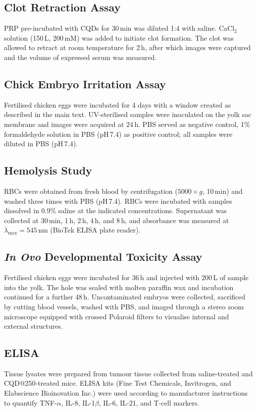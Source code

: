 \subsection*{Clot Retraction Assay}
PRP pre-incubated with CQDs for 30\,min was diluted 1:4 with saline. CaCl$_{2}$ solution
(150\,\textmu L, 200\,mM) was added to initiate clot formation. The clot was allowed to
retract at room temperature for 2\,h, after which images were captured and the volume of
expressed serum was measured.

\subsection*{Chick Embryo Irritation Assay}
Fertilised chicken eggs were incubated for 4 days with a window created as described in
the main text. UV-sterilised samples were inoculated on the yolk sac membrane and images
were acquired at 24\,h. PBS served as negative control, 1\% formaldehyde solution in PBS
(pH\,7.4) as positive control; all samples were diluted in PBS (pH\,7.4).

\subsection*{Hemolysis Study}
RBCs were obtained from fresh blood by centrifugation ($5000 \times g$, 10\,min) and
washed three times with PBS (pH\,7.4). RBCs were incubated with samples dissolved in
0.9\% saline at the indicated concentrations. Supernatant was collected at 30\,min, 1\,h,
2\,h, 4\,h, and 8\,h, and absorbance was measured at $\lambda_{\max} = 545$\,nm (BioTek
ELISA plate reader).

\subsection*{\textit{In Ovo} Developmental Toxicity Assay}
Fertilised chicken eggs were incubated for 36\,h and injected with 200\,\textmu L of
sample into the yolk. The hole was sealed with molten paraffin wax and incubation
continued for a further 48\,h. Uncontaminated embryos were collected, sacrificed by
cutting blood vessels, washed with PBS, and imaged through a stereo zoom microscope
equipped with crossed Polaroid filters to visualise internal and external structures.

\subsection*{ELISA}
Tissue lysates were prepared from tumour tissue collected from saline-treated and
CQD@250-treated mice. ELISA kits (Fine Test Chemicals, Invitrogen, and Elabscience
Bioinovation Inc.) were used according to manufacturer instructions to quantify TNF-$\alpha$,
IL-8, IL-1$\beta$, IL-6, IL-21, and T-cell markers.

